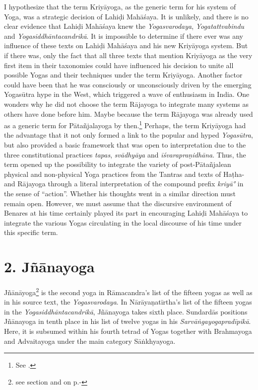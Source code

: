 I hypothesize that the term Kriyāyoga, as the generic term for his system of Yoga, was a strategic decision of Lahiḍi Mahāśaya. It is unlikely, and there is no clear evidence that Lahiḍi Mahāśaya knew the \textit{Yogasvarodaya}, \textit{Yogatattvabindu} and \textit{Yogasiddhāntacandrikā}. It is impossible to determine if there ever was any influence of these texts on Lahiḍi Mahāśaya and his new Kriyāyoga system. But if there was, only the fact that all three texts that mention Kriyāyoga as the very first item in their taxonomies could have influenced his decision to unite all possible Yogas and their techniques under the term Kriyāyoga. Another factor could have been that he was consciously or unconsciously driven by the emerging Yogasūtra hype in the West, which triggered a wave of enthusiasm in India. One wonders why he did not choose the term Rājayoga to integrate many systems as others have done before him. Maybe because the term Rājayoga was already used as a generic term for Pātañjalayoga by then.\footnote{See \citeauthor{birch2014}.} Perhaps, the term Kriyāyoga had the advantage that it not only formed a link to the popular and hyped \textit{Yogasūtra}, but also provided a basic framework that was open to interpretation due to the three constitutional practices \textit{tapas}, \textit{svādhyāya} and \textit{īśvarapraṇidhāna}. Thus, the term opened up the possibility to integrate the variety of post-Pātañjalean physical and non-physical Yoga practices from the Tantras and texts of Haṭha- and Rājayoga through a literal interpretation of the compound prefix \textit{kriyā°} in the sense of ``action''. Whether his thoughts went in a similar direction must remain open. However, we must assume that the discursive environment of Benares at his time certainly played its part in encouraging Lahiḍi Mahāśaya to integrate the various Yogas circulating in the local discourse of his time under this specific term.

\section{2. Jñānayoga}
\label{jnanayogaintro}

Jñānāyoga\footnote{see section  and  on p.\pageref{jnanayogastart}-\pageref{endsvabhava}} is the second yoga in Rāmacandra's list of the fifteen yogas as well as in his source text, the \textit{Yogasvarodaya}. In Nārāyaṇatīrtha's list of the fifteen yogas in the \textit{Yogasiddhāntacandrikā}, Jñānayoga takes sixth place. Sundardās positions Jñānayoga in tenth place in his list of twelve yogas in his \textit{Sarvāṅgayogapradīpikā}. Here, it is subsumed within his fourth tetrad of Yogas together with Brahmayoga and Advaitayoga under the main category Sāṅkhyayoga.  

